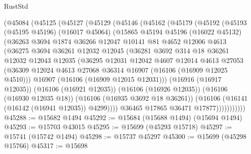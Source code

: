 \begin{lexlean}{RustStd}
\begin{coremodule}
    (@45084
      (@45125
        (@45127
          (@45129
            (@45146
              (@45162
                (@45179
                  (@45192
                    (@45193
                      (@45195 @45196)
                      (@16017 @45064)
                      (@15865
                        @45194
                        @45196
                        (@16022 @45132)
                        (@36263
                          @3694
                          @1874
                          @36266
                          @12047
                          @10141
                          @81
                          @4652
                          @12006
                          @4613
                          (@36275
                            @3694
                            @36261
                            @12032
                            @12045
                            (@36281
                              @3692
                              @314
                              @18
                              @36261
                              @12032
                              @12043
                              @12035
                              (@36295
                                @12031
                                @12042
                                @4607
                                @12014
                                @4613
                                @27053
                                (@36309
                                  @12024
                                  @4613
                                  @27068
                                  @36314
                                  @16907
                                  (@16106 (@16909 @12025 @4510)))
                                @16907
                                (@16106 (@16909 @12015 @12031)))
                              (@16916 (@16917 @12035))
                              (@16106 (@16921 @12035))
                              (@16106 (@16926 @12035))
                              (@16106 (@16930 @12035 @18))
                              (@16106 (@16935 @3692 @18 @36261))
                              (@16106 (@16141 (@16142 (@16941 @12035)) @4299))))
                          @36465
                          @17865
                          @36471
                          @17877)))))))))))
@45288 := @15682 @1494
@45292 := @15684 (@15688 @1494) (@15694 @1494)
@45293 := @15703 @43015
@45295 := @15699 (@45293 @15718)
@45297 := @15741 (@15742 @1494)
@45298 := @15737 @45297
@45300 := @15699 (@45298 @15766)
@45317 := @15698

\end{coremodule}
\end{lexlean}
